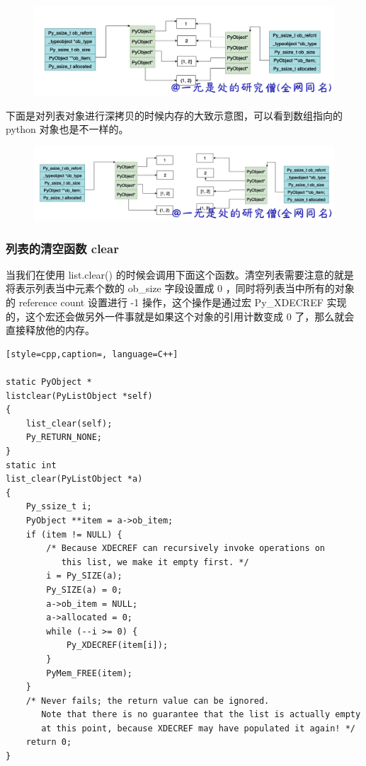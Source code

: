     \begin{figure}[h]
        \centering
            \includegraphics[scale=.3]{images/07-list.png}
            \caption{ }
        \label{fig:my_label}
    \end{figure}
    
下面是对列表对象进行深拷贝的时候内存的大致示意图，可以看到数组指向的 python 对象也是不一样的。

    \begin{figure}[h]
        \centering
            \includegraphics[scale=.3]{images/08-list.png}
            \caption{ }
        \label{fig:my_label}
    \end{figure}
    
\subsubsection{列表的清空函数 clear}
当我们在使用 list.clear() 的时候会调用下面这个函数。清空列表需要注意的就是将表示列表当中元素个数的 ob\_size 字段设置成 0 ，同时将列表当中所有的对象的 reference count 设置进行 -1 操作，这个操作是通过宏 Py\_XDECREF 实现的，这个宏还会做另外一件事就是如果这个对象的引用计数变成 0 了，那么就会直接释放他的内存。
\begin{lstlisting}[style=cpp,caption=, language=C++]

static PyObject *
listclear(PyListObject *self)
{
    list_clear(self);
    Py_RETURN_NONE;
}
static int
list_clear(PyListObject *a)
{
    Py_ssize_t i;
    PyObject **item = a->ob_item;
    if (item != NULL) {
        /* Because XDECREF can recursively invoke operations on
           this list, we make it empty first. */
        i = Py_SIZE(a);
        Py_SIZE(a) = 0;
        a->ob_item = NULL;
        a->allocated = 0;
        while (--i >= 0) {
            Py_XDECREF(item[i]);
        }
        PyMem_FREE(item);
    }
    /* Never fails; the return value can be ignored.
       Note that there is no guarantee that the list is actually empty
       at this point, because XDECREF may have populated it again! */
    return 0;
}
\end{lstlisting}
